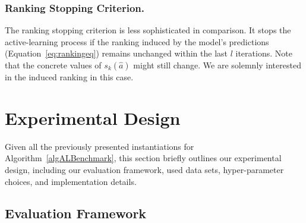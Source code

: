 \documentclass[runningheads]{llncs}
\begin{document}
\subsubsection{Ranking Stopping Criterion.}

The ranking stopping criterion is less sophisticated in comparison.
It stops the active-learning process if the ranking induced by the model's predictions (Equation~\ref{eq:rankingeq}) remains unchanged within the last $l$ iterations.
Note that the concrete values of $s_k(\hat a)$ might still change.
We are solemnly interested in the induced ranking in this case.


\section{Experimental Design}
\label{sec:exdesign}

Given all the previously presented instantiations for Algorithm~\ref{algALBenchmark}, this section briefly outlines our experimental design, including our evaluation framework, used data sets, hyper-parameter choices, and implementation details.

\subsection{Evaluation Framework}
\label{sec:exdesign:eval}
\end{document}
